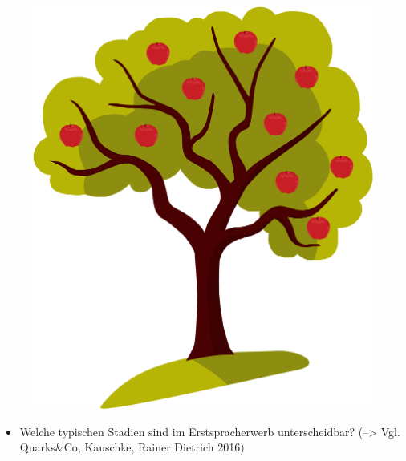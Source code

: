 \documentclass[
  letterpaper,
]{scrbook}
\providecommand{\tightlist}{%
  \setlength{\itemsep}{0pt}\setlength{\parskip}{0pt}}\usepackage{longtable,booktabs,array}
\begin{document}
\begin{figure}

{\centering 

\href{https://www.clipartmax.com/middle/m2i8K9K9G6i8b1A0_apple-tree-technology/}{\includegraphics[width=1\textwidth,height=\textheight]{./pictures/clipart46442.png}}

}

\end{figure}

\begin{itemize}
\tightlist
\item
  Welche typischen Stadien sind im Erstspracherwerb unterscheidbar?
  (--\textgreater{} Vgl. Quarks\&Co, Kauschke, Rainer Dietrich 2016)
\end{itemize}
\end{document}
